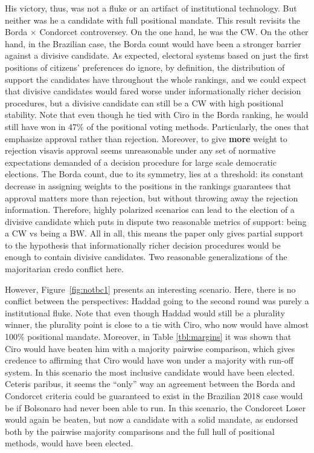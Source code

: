 \documentclass[hidelinks,11pt]{article}
\begin{document}
His victory, thus, was not a fluke or an artifact of institutional technology.
But neither was he a candidate with full positional mandate. This result
revisits the Borda \(\times\) Condorcet controversey. On the one hand, he was
the CW. On the other hand, in the Brazilian case, the
Borda count would have been a stronger barrier against a divisive candidate. As
expected, electoral systems based on just the first positions of citizens'
preferences do ignore, by definition, the distribution of support the
candidates have throughout the whole rankings, and we could expect that divisive
candidates would fared worse under informationally richer decision procedures,
but a divisive candidate can still be a CW with high positional stability. Note
that even though he tied with Ciro in the Borda ranking, he would still have won
in 47\(\%\) of the positional voting methods. Particularly, the ones that
emphasize approval rather than rejection. Moreover, to give \textbf{more} weight
to rejection visavis approval seems unreasonable under any set of normative
expectations demanded of a decision procedure for large scale democratic
elections. The Borda count, due to its symmetry, lies at a threshold: its
constant decrease in assigning weights to the positions in the rankings
guarantees that approval matters more than rejection, but without throwing away
the rejection information. Therefore, highly polarized scenarios can lead to the
election of a divisive candidate which puts in dispute two reasonable metrics of
support: being a CW vs being a BW. All in all, this
means the paper only gives partial support to the hypothesis that
informationally richer decision procedures would be enough to contain divisive
candidates. Two reasonable generalizations of the majoritarian credo conflict
here.

However, Figure~\ref{fig:notbc1} presents an interesting scenario. Here, there
is no conflict between the perspectives: Haddad going to the second round was
purely a institutional fluke. Note that even though Haddad would still be a
plurality winner, the plurality point is close to a tie with Ciro, who
now would have almost 100\(\%\) positional mandate. Moreover, in Table
\ref{tbl:margins} it was shown that Ciro would have beaten him with a majority
pairwise comparison, which gives credence to affirming that Ciro would have won
under a majority with run-off system. In this scenario the most inclusive
candidate would have been elected. Ceteris paribus, it seems the ``only'' way an
agreement between the Borda and Condorcet criteria could be guaranteed to exist
in the Brazilian 2018 case would be if Bolsonaro had never been able to run. In
this scenario, the Condorcet Loser would again be beaten, but now a candidate with a
solid mandate, as endorsed both by the pairwise majority comparisons and
the full hull of positional methods, would have been elected.
\end{document}
